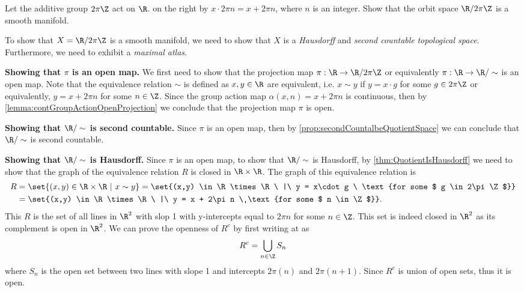  
 \begin{problem}
 	\label{problem:QuotientOfRBy2pi}
 	Let the additive group $ 2\pi\Z $ act on $ \R $. on the right by $ x\cdot 2\pi n = x + 2\pi n $, where $ n $ is an integer. Show that the orbit space $ \R/2\pi\Z $ is a smooth manifold.
 \end{problem}
 \begin{solution}
 	To show that $ X = \R/2\pi\Z $ is a smooth manifold, we need to show that $ X $ is a \emph{Hausdorff} and \emph{second countable} \emph{topological space}. Furthermore, we need to exhibit a \emph{maximal atlas}.
 	
 	\textbf{Showing that $ \pi $ is an open map.} We first need to show that the projection map $ \pi: \R \to \R/2\pi\Z  $ or equivalently $ \pi: \R \to \R/\sim $ is an open map. Note that the equivalence relation $ \sim $ is defined as $ x,y\in \R $ are equivalent, i.e. $ x\sim y $ if $ y = x\cdot g $ for some $ g\in 2\pi\Z $ or equivalently, $ y = x + 2\pi n $ for some $ n \in \Z $. Since the group action map $ \alpha(x,n) = x + 2\pi n $ is continuous, then by \autoref{lemma:contGroupActionOpenProjection} we conclude that the projection map $ \pi $ is open.
 	
 	\noindent \textbf{Showing that $ \R/\sim$ is second countable.} Since $ \pi $ is an open map, then by \autoref{prop:secondCountalbeQuotientSpace} we can conclude that $ \R/\sim $ is second countable.
 	
 	\noindent \textbf{Showing that $ \R/\sim $ is Hausdorff.} Since $ \pi $ is an open map, to show that $ \R/\sim $ is Hausdorff, by \autoref{thm:QuotientIsHausdorff} we need to show that the graph of the equivalence relation $ R $ is closed in $ \R\times \R $. The graph of this equivalence relation is
 	\begin{align*}
 		R &= \set{(x,y) \in \R\times \R \ |\ x\sim y} = \set{(x,y) \in \R\times \R \ |\ y = x\cdot g \ \text{for some $ g \in 2\pi\Z $}}\\
 		 &= \set{(x,y) \in \R\times \R\ |\ y = x + 2\pi n \ \text{for some $ n \in \Z $}}.
 	\end{align*}
	This $ R $ is the set of all lines in $ \R^2 $ with slop 1 with y-intercepts equal to $ 2\pi n $ for some $ n \in \Z $. This set is indeed closed in $ \R^2 $ as its complement is open in $ \R^2 $. We can prove the openness of $ R^c $ by first writing at as
	\[ R^c = \bigcup_{n \in \Z} S_n \]
	where $ S_n $ is the open set between two lines with slope 1 and intercepts $ 2\pi(n) $ and $ 2\pi(n+1) $. Since $ R^c $ is union of open sets, thus it is open.
	

\end{solution}
